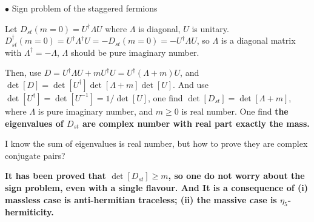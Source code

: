 $\bullet$ Sign problem of the staggered fermions

Let $D_{st}(m=0)=U^{\dagger}\Lambda U$ where $\Lambda$ is diagonal, $U$ is unitary. $D^{\dagger}_{st}(m=0)=U^{\dagger}\Lambda ^{\dagger} U=-D_{st}(m=0)=-U^{\dagger}\Lambda U$, so $\Lambda$ is a diagonal matrix with $\Lambda ^{\dagger} = - \Lambda$, $\Lambda$ should be pure imaginary number.

Then, use $D=U^{\dagger}\Lambda U + m U^{\dagger} U = U^{\dagger} \left(\Lambda + m\right)U$, and $\det [D]=\det [U^{\dagger}] \det [\Lambda + m] \det[U]$. And use $\det[U^{\dagger}]=\det[U^{-1}]=1/\det[U]$, one find $\det[D_{st}]=\det[\Lambda + m]$, where $\Lambda$ is pure imaginary number, and $m\geq 0$ is real number. One find \textbf{the eigenvalues of $D_{st}$ are complex number with real part exactly the mass.}

\textcolor[rgb]{1,0,0}{I know the sum of eigenvalues is real number, but how to prove they are complex conjugate pairs?}

\textcolor[rgb]{0,0,1}{\textbf{It has been proved that $\det [D_{st}]\geq m $, so one do not worry about the sign problem, even with a single flavour. And It is a consequence of (i) massless case is anti-hermitian traceless; (ii) the massive case is $\eta_5$-hermiticity.}}



